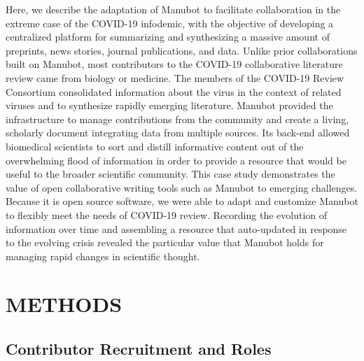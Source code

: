 \documentclass[twocolumn]{ceurart}
\begin{document}
Here, we describe the adaptation of Manubot to facilitate collaboration in the extreme case of the COVID-19 infodemic, with the objective of developing a centralized platform for summarizing and synthesizing a massive amount of preprints, news stories, journal publications, and data.
Unlike prior collaborations built on Manubot, most contributors to the COVID-19 collaborative literature review came from biology or medicine.
The members of the COVID-19 Review Consortium consolidated information about the virus in the context of related viruses and to synthesize rapidly emerging literature.
Manubot provided the infrastructure to manage contributions from the community and create a living, scholarly document integrating data from multiple sources.
Its back-end allowed biomedical scientists to sort and distill informative content out of the overwhelming flood of information \citep{1HZeeO4Cs} in order to provide a resource that would be useful to the broader scientific community.
This case study demonstrates the value of open collaborative writing tools such as Manubot to emerging challenges.
Because it is open source software, we were able to adapt and customize Manubot to flexibly meet the needs of COVID-19 review.
Recording the evolution of information over time and assembling a resource that auto-updated in response to the evolving crisis revealed the particular value that Manubot holds for managing rapid changes in scientific thought.

\hypertarget{methods}{%
\section{METHODS}\label{methods}}

\hypertarget{contributor-recruitment-and-roles}{%
\subsection{Contributor Recruitment and Roles}\label{contributor-recruitment-and-roles}}
\end{document}
